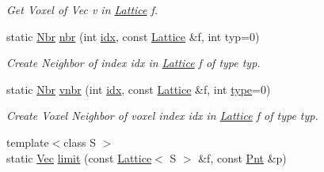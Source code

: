 \begin{DoxyCompactItemize}
\begin{DoxyCompactList}\small\item\em Get Voxel of Vec v in \hyperlink{classvsr_1_1_lattice}{Lattice} f. \end{DoxyCompactList}\item 
\hypertarget{classvsr_1_1_lattice_a8501dc2e46b661536d9734de9e99baef}{static \hyperlink{classvsr_1_1_nbr}{Nbr} \hyperlink{classvsr_1_1_lattice_a8501dc2e46b661536d9734de9e99baef}{nbr} (int \hyperlink{classvsr_1_1_lattice_adb69198162bacf492faea0ceff8e497c}{idx}, const \hyperlink{classvsr_1_1_lattice}{Lattice} \&f, int typ=0)}\label{classvsr_1_1_lattice_a8501dc2e46b661536d9734de9e99baef}

\begin{DoxyCompactList}\small\item\em Create Neighbor of index idx in \hyperlink{classvsr_1_1_lattice}{Lattice} f of type typ. \end{DoxyCompactList}\item 
\hypertarget{classvsr_1_1_lattice_a28d73ce6c8aefb6ff442df7b377aed91}{static \hyperlink{classvsr_1_1_nbr}{Nbr} \hyperlink{classvsr_1_1_lattice_a28d73ce6c8aefb6ff442df7b377aed91}{vnbr} (int \hyperlink{classvsr_1_1_lattice_adb69198162bacf492faea0ceff8e497c}{idx}, const \hyperlink{classvsr_1_1_lattice}{Lattice} \&f, int \hyperlink{classvsr_1_1_lattice_a64681e5cac4bc2567b449697c4fc6bf9}{type}=0)}\label{classvsr_1_1_lattice_a28d73ce6c8aefb6ff442df7b377aed91}

\begin{DoxyCompactList}\small\item\em Create Voxel Neighbor of voxel index idx in \hyperlink{classvsr_1_1_lattice}{Lattice} f of type typ. \end{DoxyCompactList}\item 
{\footnotesize template$<$class S $>$ }\\static \hyperlink{namespacevsr_a0d061c30ac198a710a1b92dd8b343273}{Vec} \hyperlink{classvsr_1_1_lattice_a973bbdafd3223d0cd7734de0475cca78}{limit} (const \hyperlink{classvsr_1_1_lattice}{Lattice}$<$ S $>$ \&f, const \hyperlink{namespacevsr_a2d05beb9721c5d9211b479af6d47222d}{Pnt} \&p)
\end{DoxyCompactItemize}
